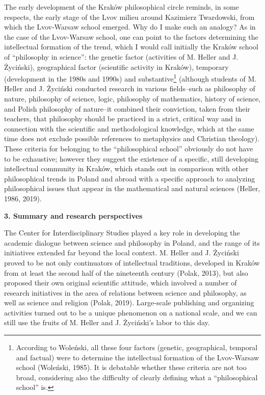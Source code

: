 \documentclass[a4paper]{article}
\begin{document}
The early development of the Kraków philosophical circle reminds, in some respects, the early stage of the Lvov milieu
around Kazimierz Twardowski, from which the Lvov-Warsaw school emerged. Why do I make such an analogy? As in the case
of the Lvov{}-Warsaw school, one can point to the factors determining the intellectual formation of the trend, which I
would call initially the Kraków school of “philosophy in science”: the genetic factor (activities of M. Heller and J.
Życiński), geographical factor (scientific activity in Kraków), temporary (development in the 1980s and 1990s) and
substantive\footnote{ According to Woleński, all these four factors (genetic, geographical, temporal and factual) were
to determine the intellectual formation of the Lvov-Warsaw school \label{ref:RNDOFxwgkR1Zb}(Woleński, 1985). It is
debatable whether these criteria are not too broad, considering also the difficulty of clearly defining what a
“philosophical school” is.} (although students of M. Heller and J. Życiński conducted research in various fields–such
as philosophy of nature, philosophy of science, logic, philosophy of mathematics, history of science, and Polish
philosophy of nature–it combined their conviction, taken from their teachers, that philosophy should be practiced in a
strict, critical way and in connection with the scientific and methodological knowledge, which at the same time does
not exclude possible references to metaphysics and Christian theology). These criteria for belonging to the
“philosophical school” obviously do not have to be exhaustive; however they suggest the existence of a specific, still
developing intellectual community in Kraków, which stands out in comparison with other philosophical trends in Poland
and abroad with a specific approach to analyzing philosophical issues that appear in the mathematical and natural
sciences \label{ref:RNDyaNTk3a3Od}(Heller, 1986, 2019).

{\bfseries
3. Summary and research perspectives}

The Center for Interdisciplinary Studies played a key role in developing the academic dialogue between science and
philosophy in Poland, and the range of its initiatives extended far beyond the local context. M. Heller and J. Życiński
proved to be not only continuators of intellectual traditions, developed in Kraków from at least the second half of the
nineteenth century \label{ref:RND0GG3DgutKJ}(Polak, 2013), but also proposed their own original scientific attitude,
which involved a number of research initiatives in the area of relations between science and philosophy, as well as
science and religion \label{ref:RNDqCSr6hAHOD}(Polak, 2019). Large-scale publishing and organizing activities turned
out to be a unique phenomenon on a national scale, and we can still use the fruits of M. Heller and J. Życiński’s labor
to this day.
\end{document}
